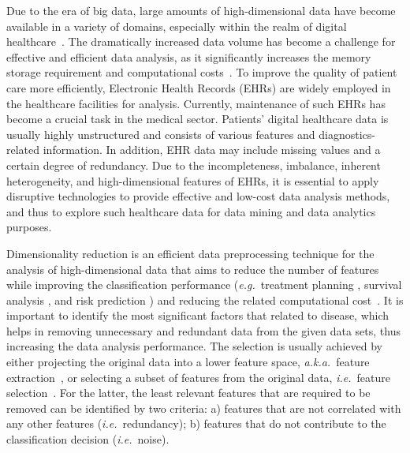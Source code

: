 \documentclass{article}
\newcommand{\zzie}{\emph{i.e.}~}
\newcommand{\zzeg}{\emph{e.g.}~}
\newcommand{\zzaka}{\emph{a.k.a.}~}
\newcommand*{\1}{\textcolor{magenta}}
\begin{document}
	Due to the era of big data, large amounts of high-dimensional data have become available in a variety of domains, especially within the realm of digital healthcare~\cite{8370732}. The dramatically increased data volume has become a challenge for effective and efficient data analysis, as it significantly increases the memory storage requirement and computational costs~\cite{li2017feature}. To improve the quality of patient care more efficiently, Electronic Health Records (EHRs) are widely employed in the healthcare facilities for analysis. Currently, maintenance of such EHRs has become a crucial task in the medical sector. Patients' digital healthcare data is usually highly unstructured and consists of various features and diagnostics-related information. In addition, EHR data may include missing values and a certain degree of redundancy. Due to the incompleteness, imbalance, inherent heterogeneity, and high-dimensional features of EHRs, it is essential to apply disruptive technologies to provide effective and low-cost data analysis methods, and thus to explore such healthcare data for data mining and data analytics purposes. 
	
	Dimensionality reduction is an efficient data preprocessing technique for the analysis of high-dimensional data that aims to reduce the number of features while improving the classification performance (\zzeg treatment planning \cite{duanmu2020prediction}, survival analysis \cite{rietschel2018feature}, and risk prediction \cite{denaxas2018prediction}) and reducing the related computational cost~\cite{8361067}. It is important to identify the most significant factors that related to disease, which helps in removing unnecessary and redundant data from the given data sets, thus increasing the data analysis performance. The selection is usually achieved by either projecting the original data into a lower feature space, \zzaka feature extraction~\cite{han2018unified}, or selecting a subset of features from the original data, \zzie feature selection~\cite{liu2014feature}. For the latter, the least relevant features that are required to be removed can be identified by two criteria: a) features that are not correlated with any other features (\zzie redundancy); b) features that do not contribute to the classification decision (\zzie noise).
	
\end{document}
